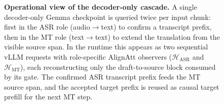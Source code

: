 \begin{figure}[t]
{
}%
\caption{\textbf{Operational view of the decoder-only cascade.}
A single decoder-only Gemma checkpoint is queried twice per input chunk: first
in the ASR role (audio$\to$text) to confirm a transcript prefix, then in the MT
role (text$\to$text) to extend the translation from the visible source span.
In the runtime this appears as two sequential vLLM requests with role-specific
AlignAtt observers ($\mathcal{H}_{\mathrm{ASR}}$ and $\mathcal{H}_{\mathrm{MT}}$),
each reconstructing only the draft-to-source block consumed by its gate. The
confirmed ASR transcript prefix feeds the MT source span, and the accepted target
prefix is reused as causal target prefill for the next MT step.}
\label{fig:dual-alignatt-cascade}
\end{figure}
